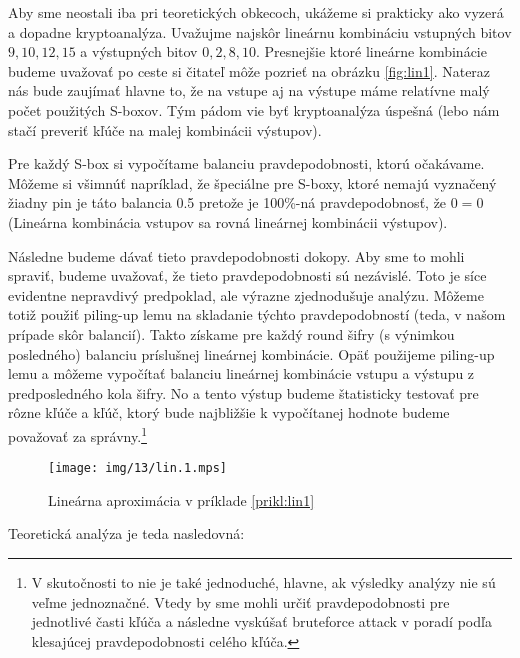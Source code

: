 \begin{priklad}
    \label{prikl:lin1}

    Aby sme neostali iba pri teoretických obkecoch, ukážeme si
    prakticky ako vyzerá a dopadne kryptoanalýza. Uvažujme najskôr
    lineárnu kombináciu vstupných bitov $9,10,12,15$ a výstupných
    bitov $0,2,8,10$. Presnejšie ktoré lineárne kombinácie budeme
    uvažovať po ceste si čitateľ môže pozrieť na obrázku
    \ref{fig:lin1}. Nateraz nás bude zaujímať hlavne to, že na
    vstupe aj na výstupe máme relatívne malý počet použitých S-boxov.
    Tým pádom vie byť kryptoanalýza úspešná (lebo nám stačí preveriť
    kľúče na malej kombinácii výstupov).

    Pre každý S-box si vypočítame balanciu pravdepodobnosti, ktorú
    očakávame. Môžeme si všimnúť napríklad, že špeciálne pre S-boxy,
    ktoré nemajú vyznačený žiadny pin je táto balancia 0.5 pretože je
    100\%-ná pravdepodobnosť, že $0 = 0$ (Lineárna kombinácia vstupov
    sa rovná lineárnej kombinácii výstupov).

    Následne budeme dávať tieto pravdepodobnosti dokopy. Aby sme to
    mohli spraviť, budeme uvažovať, že tieto pravdepodobnosti sú
    nezávislé. Toto je síce evidentne nepravdivý predpoklad, ale
    výrazne zjednodušuje analýzu. Môžeme totiž použiť piling-up lemu
    na skladanie týchto pravdepodobností (teda, v našom prípade skôr
    balancií). Takto získame pre každý round šifry (s výnimkou
    posledného) balanciu príslušnej
    lineárnej kombinácie. Opäť použijeme piling-up lemu a môžeme
    vypočítať balanciu lineárnej kombinácie vstupu a výstupu z
    predposledného kola šifry. No a tento výstup budeme štatisticky
    testovať pre rôzne kľúče a kľúč, ktorý bude najbližšie k
    vypočítanej hodnote budeme považovať za správny.\footnote{V
    skutočnosti to nie je také jednoduché, hlavne, ak výsledky analýzy
    nie sú veľme jednoznačné. Vtedy by sme mohli určiť pravdepodobnosti
    pre jednotlivé časti kľúča a následne vyskúšať bruteforce attack
    v poradí podľa klesajúcej pravdepodobnosti celého kľúča.}

    \begin{figure}[H]
        \centering
        \texttt{[image: img/13/lin.1.mps]}
        \caption{Lineárna aproximácia v príklade \ref{prikl:lin1}}
    \end{figure}


    Teoretická analýza je teda nasledovná:
    


\end{priklad}
